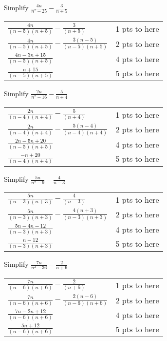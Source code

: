 {
	Simplify $\displaystyle \frac{4n}{n^2-25}-\frac{3}{n+5}$
}
{
	\begin{tabular}{l r}
	$\frac{4n}{(n-5)(n+5)} - \frac{3}{(n+5)}$ & 1 pts to here\\
	$\frac{4n}{(n-5)(n+5)} - \frac{3(n-5)}{(n-5)(n+5)}$ & 2 pts to here\\
	$\frac{4n-3n+15}{(n-5)(n+5)}$ & 4 pts to here\\
	$\frac{n+15}{(n-5)(n+5)}$ & 5 pts to here\\
	\end{tabular}
}

{
	Simplify $\displaystyle \frac{2n}{n^2-16}-\frac{5}{n+4}$
}
{
	\begin{tabular}{l r}
	$\frac{2n}{(n-4)(n+4)} - \frac{5}{(n+4)}$ & 1 pts to here\\
	$\frac{2n}{(n-4)(n+4)} - \frac{5(n-4)}{(n-4)(n+4)}$ & 2 pts to here\\
	$\frac{2n-5n+20}{(n-5)(n+5)}$ & 4 pts to here\\
	$\frac{-n+20}{(n-4)(n+4)}$ & 5 pts to here\\
	\end{tabular}
}

{
	Simplify $\displaystyle \frac{5n}{n^2-9}-\frac{4}{n-3}$
}
{
	\begin{tabular}{l r}
	$\frac{5n}{(n-3)(n+3)} - \frac{4}{(n-3)}$ & 1 pts to here\\
	$\frac{5n}{(n-3)(n+3)} - \frac{4(n+3)}{(n-3)(n+3)}$ & 2 pts to here\\
	$\frac{5n-4n-12}{(n-3)(n+3)}$ & 4 pts to here\\
	$\frac{n-12}{(n-3)(n+3)}$ & 5 pts to here\\
	\end{tabular}
}


{
	Simplify $\displaystyle \frac{7n}{n^2-36}-\frac{2}{n+6}$
}
{
	\begin{tabular}{l r}
	$\frac{7n}{(n-6)(n+6)} - \frac{2}{(n+6)}$ & 1 pts to here\\
	$\frac{7n}{(n-6)(n+6)} - \frac{2(n-6)}{(n-6)(n+6)}$ & 2 pts to here\\
	$\frac{7n-2n+12}{(n-6)(n+6)}$ & 4 pts to here\\
	$\frac{5n+12}{(n-6)(n+6)}$ & 5 pts to here\\
	\end{tabular}
}

